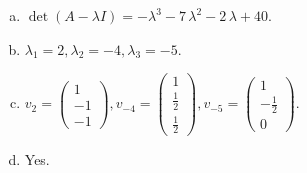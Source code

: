 \begin{questions}
\begin{solution}
\begin{enumerate}[(a)]
\item $\det(A-\lambda I)=-{\lambda}^{3} - 7 \, {\lambda}^{2} - 2 \, {\lambda} + 40$.
\item ${\lambda}_1=2, {\lambda}_2=-4, {\lambda}_3=-5$.
\item $v_{2}=\left(\begin{array}{r}
1 \\
-1 \\
-1
\end{array}\right), v_{-4}=\left(\begin{array}{r}
1 \\
\frac{1}{2} \\
\frac{1}{2}
\end{array}\right), v_{-5}=\left(\begin{array}{r}
1 \\
-\frac{1}{2} \\
0
\end{array}\right)$.
\item Yes.
\end{enumerate}
\end{solution}

\end{questions}

\newpage


\begin{center}
\end{center}

